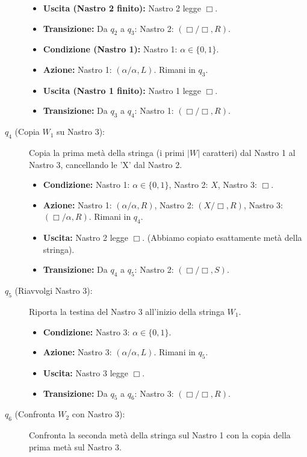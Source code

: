 \documentclass[a4paper, 11pt]{book} %
\theoremstyle{definition}
\begin{document}
\begin{description}
\begin{itemize}
        \item \textbf{Uscita (Nastro 2 finito):} Nastro 2 legge $\Box$.
        \item \textbf{Transizione:} Da $q_2$ a $q_3$: Nastro 2: $(\Box/\Box, R)$.
        \item \textbf{Condizione (Nastro 1):} Nastro 1: $\alpha \in \{0,1\}$.
        \item \textbf{Azione:} Nastro 1: $(\alpha/\alpha, L)$. Rimani in $q_3$.
        \item \textbf{Uscita (Nastro 1 finito):} Nastro 1 legge $\Box$.
        \item \textbf{Transizione:} Da $q_3$ a $q_4$: Nastro 1: $(\Box/\Box, R)$.
    \end{itemize}
    \item[$q_4$ (Copia $W_1$ su Nastro 3):] Copia la prima metà della stringa (i primi $|W|$ caratteri) dal Nastro 1 al Nastro 3, cancellando le 'X' dal Nastro 2.
    \begin{itemize}
        \item \textbf{Condizione:} Nastro 1: $\alpha \in \{0,1\}$, Nastro 2: $X$, Nastro 3: $\Box$.
        \item \textbf{Azione:} Nastro 1: $(\alpha/\alpha, R)$, Nastro 2: $(X/\Box, R)$, Nastro 3: $(\Box/\alpha, R)$. Rimani in $q_4$.
        \item \textbf{Uscita:} Nastro 2 legge $\Box$. (Abbiamo copiato esattamente metà della stringa).
        \item \textbf{Transizione:} Da $q_4$ a $q_5$: Nastro 2: $(\Box/\Box, S)$.
    \end{itemize}
    \item[$q_5$ (Riavvolgi Nastro 3):] Riporta la testina del Nastro 3 all'inizio della stringa $W_1$.
    \begin{itemize}
        \item \textbf{Condizione:} Nastro 3: $\alpha \in \{0,1\}$.
        \item \textbf{Azione:} Nastro 3: $(\alpha/\alpha, L)$. Rimani in $q_5$.
        \item \textbf{Uscita:} Nastro 3 legge $\Box$.
        \item \textbf{Transizione:} Da $q_5$ a $q_6$: Nastro 3: $(\Box/\Box, R)$.
    \end{itemize}
    \item[$q_6$ (Confronta $W_2$ con Nastro 3):] Confronta la seconda metà della stringa sul Nastro 1 con la copia della prima metà sul Nastro 3.
    \begin{itemize}

\end{itemize}
\end{description}
\end{document}
